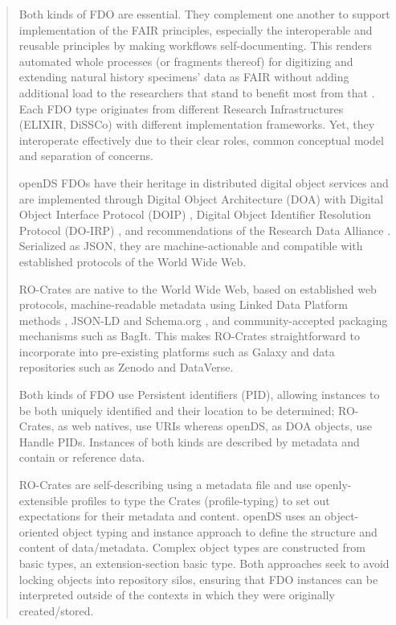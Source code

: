   \begin{quotation}
  Both kinds of FDO are essential.
  They complement one another to support
  implementation of the FAIR principles, especially the interoperable and
  reusable principles by making workflows self-documenting.
  This renders
  automated whole processes (or fragments thereof) for digitizing and
  extending natural history specimens' data as FAIR without adding
  additional load to the researchers that stand to benefit most from that
  \cite{ch8-27}.
  Each FDO type originates from different Research
  Infrastructures (ELIXIR, DiSSCo) with different implementation
  frameworks.
  Yet, they interoperate effectively due to their clear roles,
  common conceptual model and separation of concerns.


  openDS FDOs have their heritage in distributed digital object services
  \cite{ch8-46} and are implemented through Digital Object Architecture (DOA)
  \cite{ch8-62} with Digital Object Interface Protocol (DOIP) \cite{DONA 2018}, Digital
  Object Identifier Resolution Protocol (DO-IRP) \cite{rfc3652}, and
  recommendations of the Research Data Alliance \cite{ch8-65}.
  Serialized as
  JSON, they are machine-actionable and compatible with established
  protocols of the World Wide Web.

  RO-Crates are native to the World Wide Web, based on established web
  protocols, machine-readable metadata using Linked Data Platform methods
  \cite{ch8-66}, JSON-LD and Schema.org \cite{Bechhofer 2013}, and community-accepted
  packaging mechanisms such as BagIt.
  This makes RO-Crates straightforward
  to incorporate into pre-existing platforms such as Galaxy and data
  repositories such as Zenodo and DataVerse.

  Both kinds of FDO use Persistent identifiers (PID), allowing instances
  to be both uniquely identified and their location to be determined;
  RO-Crates, as web natives, use URIs whereas openDS, as DOA objects, use
  Handle PIDs.
  Instances of both kinds are described by metadata and
  contain or reference data.

  RO-Crates are self-describing using a metadata file and use
  openly-extensible profiles to type the Crates (profile-typing) to set
  out expectations for their metadata and content. openDS uses an
  object-oriented object typing and instance approach to define the
  structure and content of data/metadata.
  Complex object types are
  constructed from basic types, an extension-section basic type.
  Both
  approaches seek to avoid locking objects into repository silos, ensuring
  that FDO instances can be interpreted outside of the contexts in which
  they were originally created/stored.


\end{quotation}
